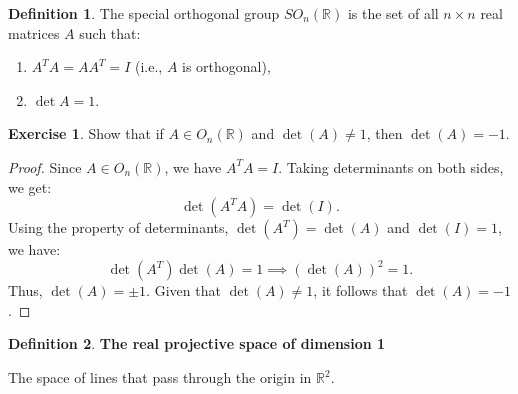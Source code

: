 \documentclass[11pt]{article}
\theoremstyle{definition}
\newtheorem{definition}{Definition}[section]
\newtheorem{exercise}{Exercise}
\theoremstyle{remark}
\begin{document}
\begin{definition}\label{def:so_n}
The special orthogonal group $SO_n(\mathbb{R})$ is the set of all $n \times n$ real matrices $A$ such that:
\begin{enumerate}
    \item $A^T A = AA^T = I$ (i.e., $A$ is orthogonal),
    \item $\det A = 1$.
\end{enumerate}
\end{definition}

\begin{exercise}\label{ex:det_orthogonal}
Show that if $A \in O_n(\mathbb{R})$ and $\det(A) \neq 1$, then $\det(A) = -1$.
\end{exercise}

\begin{proof}
Since $A \in O_n(\mathbb{R})$, we have $A^T A = I$. Taking determinants on both sides, we get:
\[
\det(A^T A) = \det(I).
\]
Using the property of determinants, $\det(A^T) = \det(A)$ and $\det(I) = 1$, we have:
\[
\det(A^T) \det(A) = 1 \implies (\det(A))^2 = 1.
\]
Thus, $\det(A) = \pm 1$. Given that $\det(A) \neq 1$, it follows that $\det(A) = -1$.
\end{proof}

\begin{definition}\label{def:real_projective_space_1}
\textbf{The real projective space of dimension 1}

The space of lines that pass through the origin in $\mathbb{R}^2$.
\end{definition}
\end{document}
